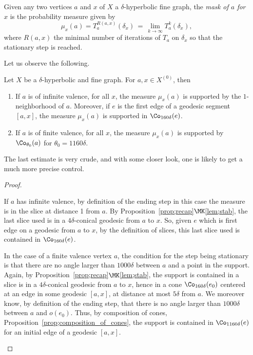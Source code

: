 \begin{defi}\label{flot}
Given any two vertices $a$ and $x$ of $X$ a $\delta$-hyperbolic fine graph, the \emph{mask of $a$ for $x$} is the probability measure given by
\[
\mu_x(a)=T^{R(a,x)}_a (\delta_x) \, =\, \lim_{k\to\infty} T^k_a (\delta_x),
\]
where $R(a,x)$ the minimal number of iterations of $T_a$ on $\delta_x$ so that the stationary step is reached.
\end{defi}

Let us observe the following.

\begin{prop}\label{prop;theta0}
Let $X$ be a $\delta$-hyperbolic and fine graph. For $a,x\in X^{(0)}$, then
\begin{enumerate}
\item \label{2.4.1} If $a$ is of infinite valence, for all $x$, the measure $\mu_x(a)$ is supported by the $1$-neighborhood of $a$. Moreover, if $e$ is the first edge of a geodesic segment $[a,x]$, the measure $\mu_x(a)$ is supported in ${\Co}_{160\delta}(e)$.
\item \label{2.4.2} If $a$ is of finite valence, for all $x$, the measure $\mu_x(a)$ is supported by ${\Co}_{\theta_0}(a)$ for $\theta_0=1160\delta$.
\end{enumerate}
\end{prop}

The last estimate is very crude, and with some closer look, one is likely to get a much more precise control.

\begin{proof}
\begin{step}[\eqref{2.4.1}] If $a$ has infinite valence, by definition of the ending step in this case the measure is in the slice at distance 1 from $a$. By Proposition~\ref{prop;recap}$\MK$\eqref{lem;stab}, the last slice used is in a $4\delta$-conical geodesic from $a$ to $x$. So, given $e$ which is first edge on a geodesic from $a$ to $x$, by the definition of slices, this last slice used is contained in ${\Co}_{160\delta}(e)$.
\end{step}

\begin{laststep}[\eqref{2.4.2}]
In the case of a finite valence vertex $a$, the condition for the step being stationary is that there are no angle larger than $1000\delta$ between $a$ and a point in the support. Again, by Proposition~\ref{prop;recap}$\MK$\eqref{lem;stab}, the support is contained in a slice is in a $4\delta$-conical geodesic from $a$ to $x$, hence in a cone $\Co_{160\delta} (e_0)$ centered at an edge in some geodesic $[a,x]$, at distance at most $5\delta$ from $a$. We moreover know, by definition of the ending step, that there is no angle larger than $1000\delta$ between $a$ and $o(e_0)$. Thus, by composition of cones, Proposition~\ref{prop;composition_of_cones}, the support is contained in $\Co_{1160\delta} (e)$ for an initial edge of a geodesic $[a, x]$.
\end{laststep}
\let\qed\relax
\end{proof}


